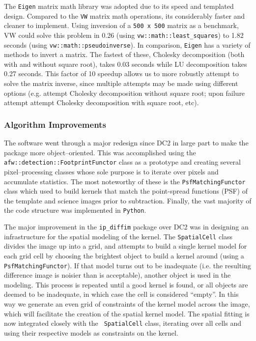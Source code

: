 The {\tt Eigen} matrix math library was adopted due to its speed and
templated design.  Compared to the {\tt VW} matrix math operations,
its considerably faster and cleaner to implement.  Using inversion of
a {\tt 500 x 500} matrix as a benchmark, VW could solve this problem
in 0.26 (using {\tt vw::math::least\_squares}) to 1.82 seconds (using
{\tt vw::math::pseudoinverse}).  In comparison, {\tt Eigen} has a
variety of methods to invert a matrix.  The fastest of these, Cholesky
decomposition (both with and without square root), takes 0.03 seconds
while LU decomposition takes 0.27 seconds.  This factor of 10 speedup
allows us to more robustly attempt to solve the matrix inverse, since
multiple attempts may be made using different options (e.g. attempt
Cholesky decomposition without square root; upon failure attempt
attempt Cholesky decomposition with square root, etc).


\subsubsection{Algorithm Improvements} \label{sec:ImsubImprove}

The software went through a major redesign since DC2 in large part to
make the package more object--oriented.  This was accomplished using
the {\tt afw::detection::FootprintFunctor} class as a prototype and
creating several pixel--processing classes whose sole purpose is to
iterate over pixels and accumulate statistics.  The most noteworthy of
these is the {\tt PsfMatchingFunctor} class which used to build
kernels that match the point-spread functions (PSF) of the
template and science images prior to subtraction.  Finally, the vast
majority of the code structure was implemented in {\tt Python}.

The major improvement in the {\tt ip\_diffim} package over DC2 was in
designing an infrastructure for the spatial modeling of the kernel.
The {\tt SpatialCell} class divides the image up into a grid, and
attempts to build a single kernel model for each grid cell by choosing
the brightest object to build a kernel around (using a {\tt
PsfMatchingFunctor}).  If that model turns out to be inadequate
(i.e. the resulting difference image is noisier than is acceptable),
another object is used in the modeling.  This process is repeated
until a good kernel is found, or all objects are deemed to be
inadequate, in which case the cell is considered ``empty''.  In this
way we generate an even grid of constraints of the kernel model across
the image, which will facilitate the creation of the spatial kernel
model.  The spatial fitting is now integrated closely with the {\tt
SpatialCell} class, iterating over all cells and using their
respective models as constraints on the kernel.

